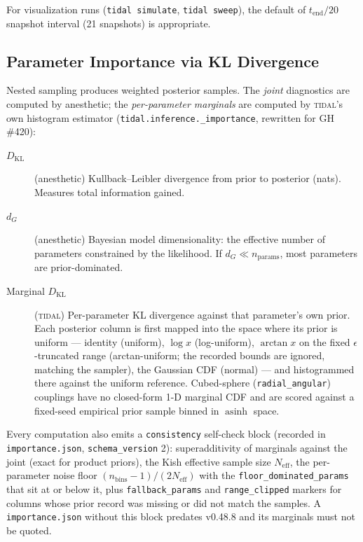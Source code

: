 For visualization runs (\texttt{tidal simulate}, \texttt{tidal sweep}),
the default of $t_\mathrm{end}/20$ snapshot interval (21 snapshots) is
appropriate.

\subsection{Parameter Importance via KL Divergence}
\label{sec:inference-importance}

Nested sampling produces weighted posterior samples.  The \emph{joint}
diagnostics are computed by anesthetic; the \emph{per-parameter marginals}
are computed by \textsc{tidal}'s own histogram estimator
(\texttt{tidal.inference.\_importance}, rewritten for GH \#420):

\begin{description}
  \item[$D_\mathrm{KL}$] (anesthetic) Kullback--Leibler divergence from
    prior to posterior (nats).  Measures total information gained.
  \item[$d_G$] (anesthetic) Bayesian model dimensionality: the effective
    number of parameters constrained by the likelihood.  If
    $d_G \ll n_\mathrm{params}$, most parameters are prior-dominated.
  \item[Marginal $D_\mathrm{KL}$] (\textsc{tidal}) Per-parameter KL
    divergence against that parameter's own prior.  Each posterior column
    is first mapped into the space where its prior is uniform ---
    identity (uniform), $\log x$ (log-uniform), $\arctan x$ on the fixed
    $\epsilon$-truncated range (arctan-uniform; the recorded bounds are
    ignored, matching the sampler), the Gaussian CDF (normal) --- and
    histogrammed there against the uniform reference.  Cubed-sphere
    (\texttt{radial\_angular}) couplings have no closed-form 1-D marginal
    CDF and are scored against a fixed-seed empirical prior sample binned
    in $\operatorname{asinh}$ space.
\end{description}

Every computation also emits a \texttt{consistency} self-check block
(recorded in \texttt{importance.json}, \texttt{schema\_version} 2):
superadditivity of marginals against the joint (exact for product priors),
the Kish effective sample size $N_\mathrm{eff}$, the per-parameter noise
floor $(n_\mathrm{bins}-1)/(2N_\mathrm{eff})$ with the
\texttt{floor\_dominated\_params} that sit at or below it, plus
\texttt{fallback\_params} and \texttt{range\_clipped} markers for columns
whose prior record was missing or did not match the samples.  A
\texttt{importance.json} without this block predates v0.48.8 and its
marginals must not be quoted.

